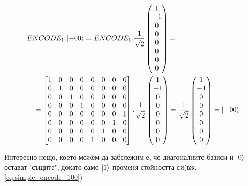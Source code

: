 \documentclass[11pt,oneside,a4paper]{article}
\begin{document}
\begin{equation}
\begin{multlined}
    ENCODE_1 . \ket{-00} = ENCODE_1 .
    \frac{1}{\sqrt{2}}\begin{pmatrix}1\\-1\\0\\0\\0\\0\\0\\0\end{pmatrix} = \\
    = \begin{bmatrix}
    1 & 0 & 0 & 0 & 0 & 0 & 0 & 0\\
    0 & 1 & 0 & 0 & 0 & 0 & 0 & 0\\
    0 & 0 & 1 & 0 & 0 & 0 & 0 & 0\\
    0 & 0 & 0 & 1 & 0 & 0 & 0 & 0\\
    0 & 0 & 0 & 0 & 0 & 0 & 0 & 1\\
    0 & 0 & 0 & 0 & 0 & 0 & 1 & 0\\
    0 & 0 & 0 & 0 & 0 & 1 & 0 & 0\\
    0 & 0 & 0 & 0 & 1 & 0 & 0 & 0
    \end{bmatrix} . \frac{1}{\sqrt{2}}\begin{pmatrix}1\\-1\\0\\0\\0\\0\\0\\0\end{pmatrix} = \frac{1}{\sqrt{2}}\begin{pmatrix}1\\-1\\0\\0\\0\\0\\0\\0\end{pmatrix} = \ket{-00}
\end{multlined}
\label{eq:simple_encode_-00}
\end{equation}

Интересно нещо, което можем да забележим е, че диагоналните базиси и ${\left\vert{0}\right\rangle}$ остават "същите", докато само ${\left\vert{1}\right\rangle}$ променя стойността си(вж. \eqref{eq:simple_encode_100})
\end{document}
